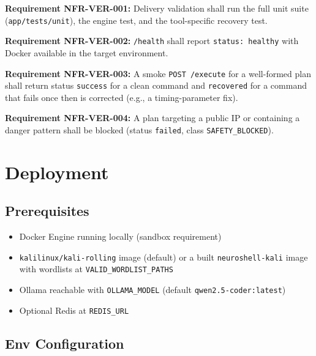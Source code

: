 \documentclass[10pt,journal,onecolumn]{IEEEtran}
\newcommand{\reqid}[1]{\textbf{#1}}
\begin{document}
\reqid{Requirement NFR-VER-001:} Delivery validation shall run the full unit suite (\texttt{app/tests/unit}), the engine test, and the tool-specific recovery test.

\reqid{Requirement NFR-VER-002:} \texttt{/health} shall report \texttt{status: healthy} with Docker available in the target environment.

\reqid{Requirement NFR-VER-003:} A smoke \texttt{POST /execute} for a well-formed plan shall return status \texttt{success} for a clean command and \texttt{recovered} for a command that fails once then is corrected (e.g., a timing-parameter fix).

\reqid{Requirement NFR-VER-004:} A plan targeting a public IP or containing a danger pattern shall be blocked (status \texttt{failed}, class \texttt{SAFETY\_BLOCKED}).

\section{Deployment}

\subsection{Prerequisites}

\begin{itemize}
\item Docker Engine running locally (sandbox requirement)
\item \texttt{kalilinux/kali-rolling} image (default) or a built \texttt{neuroshell-kali} image with wordlists at \texttt{VALID\_WORDLIST\_PATHS}
\item Ollama reachable with \texttt{OLLAMA\_MODEL} (default \texttt{qwen2.5-coder:latest})
\item Optional Redis at \texttt{REDIS\_URL}
\end{itemize}

\subsection{Env Configuration}
\end{document}

